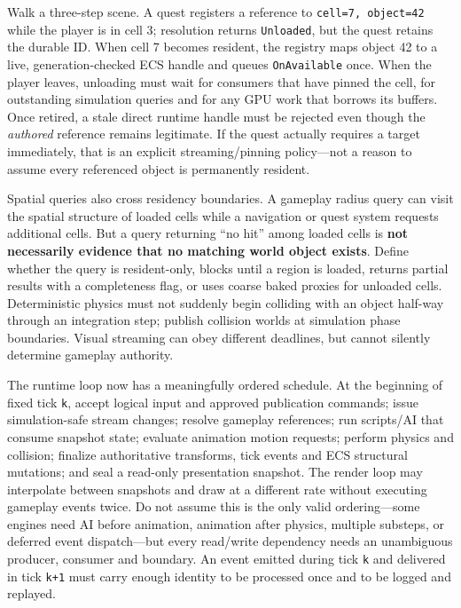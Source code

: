 Walk a three-step scene. A quest registers a reference to \texttt{cell=7,\ object=42} while the player is in cell 3; resolution returns \texttt{Unloaded}, but the quest retains the durable ID. When cell 7 becomes resident, the registry maps object 42 to a live, generation-checked ECS handle and queues \texttt{OnAvailable} once. When the player leaves, unloading must wait for consumers that have pinned the cell, for outstanding simulation queries and for any GPU work that borrows its buffers. Once retired, a stale direct runtime handle must be rejected even though the \emph{authored} reference remains legitimate. If the quest actually requires a target immediately, that is an explicit streaming/pinning policy---not a reason to assume every referenced object is permanently resident.

Spatial queries also cross residency boundaries. A gameplay radius query can visit the spatial structure of loaded cells while a navigation or quest system requests additional cells. But a query returning ``no hit'' among loaded cells is \textbf{not necessarily evidence that no matching world object exists}. Define whether the query is resident-only, blocks until a region is loaded, returns partial results with a completeness flag, or uses coarse baked proxies for unloaded cells. Deterministic physics must not suddenly begin colliding with an object half-way through an integration step; publish collision worlds at simulation phase boundaries. Visual streaming can obey different deadlines, but cannot silently determine gameplay authority.

The runtime loop now has a meaningfully ordered schedule. At the beginning of fixed tick \texttt{k}, accept logical input and approved publication commands; issue simulation-safe stream changes; resolve gameplay references; run scripts/AI that consume snapshot state; evaluate animation motion requests; perform physics and collision; finalize authoritative transforms, tick events and ECS structural mutations; and seal a read-only presentation snapshot. The render loop may interpolate between snapshots and draw at a different rate without executing gameplay events twice. Do not assume this is the only valid ordering---some engines need AI before animation, animation after physics, multiple substeps, or deferred event dispatch---but every read/write dependency needs an unambiguous producer, consumer and boundary. An event emitted during tick \texttt{k} and delivered in tick \texttt{k+1} must carry enough identity to be processed once and to be logged and replayed.

